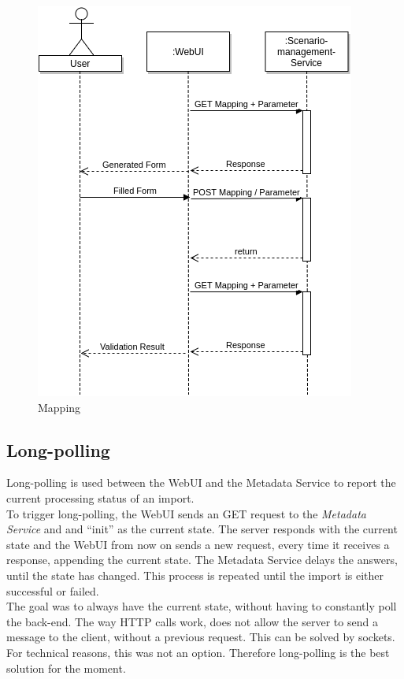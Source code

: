 \begin{figure}[H]
	\centering\includegraphics[width=.65\textwidth]{res/Mapping}
	\caption{Mapping}
	\label{fig:mapping}
\end{figure}


\subsection{Long-polling}
\label{sec:long-polling}
Long-polling is used between the WebUI and the Metadata Service to report the current processing status of an import.\\
To trigger long-polling, the WebUI sends an GET request to the \textit{Metadata Service} and and \enquote{init} as the current state. The server responds with the current state and the WebUI from now on sends a new request, every time it receives a response, appending the current state. The Metadata Service delays the answers, until the state has changed. This process is repeated until the import is either successful or failed.\\
The goal was to always have the current state, without having to constantly poll the back-end. The way HTTP calls work, does not allow the server to send a message to the client, without a previous request. This can be solved by sockets. For technical reasons, this was not an option. Therefore long-polling is the best solution for the moment.

